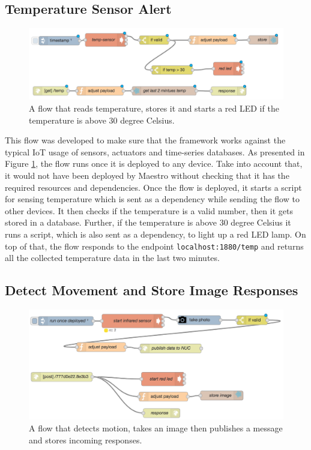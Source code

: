 \subsection{Temperature Sensor Alert}\label{susbec:temp}

 \begin{figure}[H]
	\centering
	\includegraphics[scale=0.6]{images/flow-temp.png}
	\caption{A flow that reads temperature, stores it and starts a red LED if the temperature is above 30 degree Celsius.}
	\label{fig:flow-temp}
\end{figure}

This flow was developed to make sure that the  framework works against the typical IoT usage of sensors, actuators and time-series databases. As presented in Figure \ref{fig:flow-temp}, the flow runs once it is deployed to any device. Take into account that, it would not have been deployed by Maestro without checking that it has the required resources and dependencies. Once the flow is deployed, it starts a script for sensing temperature  which is sent as a dependency while sending the flow to other devices. It then checks if the temperature is a valid number, then it gets stored in a database. Further, if the temperature is above 30 degree Celsius it runs a script, which is also sent as a dependency, to light up a red LED lamp. On top of that, the flow responds to the endpoint \verb|localhost:1880/temp| and returns all the collected temperature data in the last two minutes.




\subsection{Detect Movement and Store Image Responses} \label{subsec:detect-move}

\begin{figure}[H]
	\centering
	\includegraphics[scale=0.6]{images/flow-motion.png}
	\caption{A flow that detects motion, takes an image then publishes a message and stores incoming responses.}
	\label{fig:flow-motion}
\end{figure}

